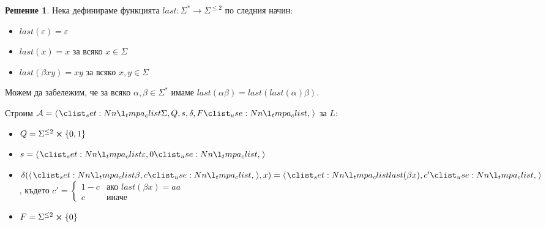 \documentclass{article}
\theoremstyle{definition}
\newtheorem*{solution}{Решение}
\begin{document}
\begin{solution}
    Нека дефинираме функцията $last : \Sigma^* \rightarrow \Sigma^{\leq 2}$ по следния начин:

    \begin{itemize}
        \item $last(\varepsilon) = \varepsilon$
        \item $last(x) = x$ за всяко $x \in \Sigma$
        \item $last(\beta xy) = xy$ за всяко $x, y \in \Sigma$
    \end{itemize}

    Можем да забележим, че за всяко $\alpha, \beta \in \Sigma^*$ имаме $last(\alpha \beta) = last(last(\alpha) \beta)$.

    Строим $\mathcal{A} = \opair{\Sigma, Q, s, \delta, F}$ за $L$:

    \begin{itemize}
        \item $Q = \Sigma^{\leq 2} \cross \{ 0, 1 \}$
        \item $s = \opair{\varepsilon, 0}$
        \item $\delta(\opair{\beta, c}, x) = \opair{last(\beta x), c'}$, където
              $c' = \begin{cases}
                      1 - c & \text{ако } last(\beta x) = aa \\
                      c     & \text{иначе}
                  \end{cases}$
        \item $F = \Sigma^{\leq 2} \cross \{ 0 \}$

    \end{itemize}


\end{solution}
\end{document}
